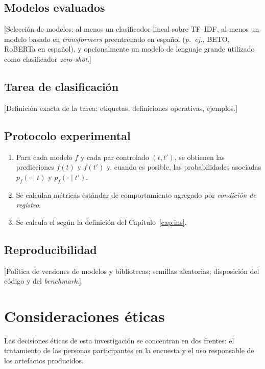 \subsection{Modelos evaluados}

[Selección de modelos: al menos un clasificador lineal sobre TF--IDF, al
menos un modelo basado en \textit{transformers} preentrenado en español
(\textit{p.\ ej.,} BETO, RoBERTa en español), y opcionalmente un modelo de
lenguaje grande utilizado como clasificador \textit{zero-shot}.]

\subsection{Tarea de clasificación}

[Definición exacta de la tarea: etiquetas, definiciones operativas, ejemplos.]

\subsection{Protocolo experimental}

\begin{enumerate}
  \item Para cada modelo $f$ y cada par controlado $(t, t')$, se obtienen las
    predicciones $f(t)$ y $f(t')$ y, cuando es posible, las probabilidades
    asociadas $p_f(\cdot \mid t)$ y $p_f(\cdot \mid t')$.
  \item Se calculan métricas estándar de comportamiento agregado por
    \emph{condición de registro}.
  \item Se calcula el \INS según la definición del Capítulo~\ref{cap:ins}.
\end{enumerate}

\subsection{Reproducibilidad}

[Política de versiones de modelos y bibliotecas; semillas aleatorias;
disposición del código y del \emph{benchmark}.]

\section{Consideraciones éticas}
\label{sec:etica}

Las decisiones éticas de esta investigación se concentran en dos frentes: el
tratamiento de las personas participantes en la encuesta y el uso responsable
de los artefactos producidos.

